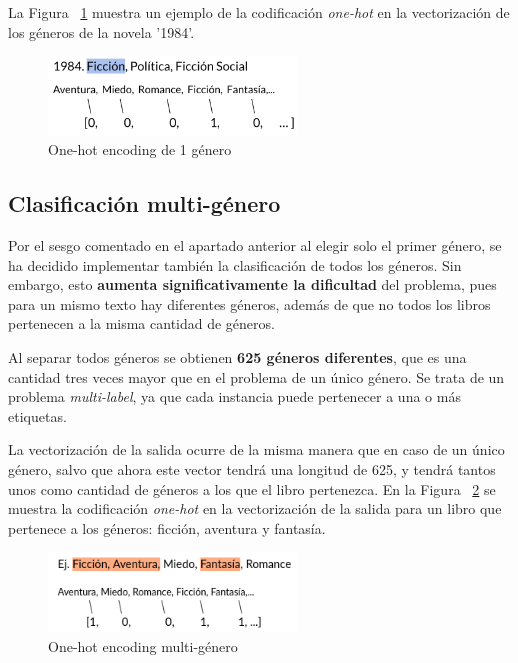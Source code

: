 \documentclass[12pt,a4paper, xcolor=table]{article}
\begin{document}
\vspace{3mm}

La Figura ~\ref{fig:unGenero} muestra un ejemplo de la codificación \textit{one-hot} en la vectorización de los géneros de la novela '1984'.

  \begin{figure}[!h]
    \centering
    \includegraphics[width=250px]{img/1984_Genres.png}
    \caption{One-hot encoding de 1 género}
    \label{fig:unGenero}
  \end{figure}

\newpage

\subsection{Clasificación multi-género}
Por el sesgo comentado en el apartado anterior al elegir solo el primer género, se ha decidido implementar también la clasificación de todos los géneros. Sin embargo, esto \textbf{aumenta significativamente la dificultad} del problema, pues para un mismo texto hay diferentes géneros, además de que no todos los libros pertenecen a la misma cantidad de géneros.

\vspace{3mm}

Al separar todos géneros se obtienen \textbf{625 géneros diferentes}, que es una cantidad tres veces mayor que en el problema de un único género. Se trata de un problema \textit{multi-label}, ya que cada instancia puede pertenecer a una o más etiquetas.

\vspace{3mm}

La vectorización de la salida ocurre de la misma manera que en caso de un único género, salvo que ahora este vector tendrá una longitud de 625, y tendrá tantos unos como cantidad de géneros a los que el libro pertenezca. En la Figura ~\ref{fig:variosGeneros} se muestra la codificación \textit{one-hot} en la vectorización de la salida para un libro que pertenece a los géneros: ficción, aventura y fantasía.

  \begin{figure}[!h]
    \centering
    \includegraphics[width=250px]{img/ej_one_hot_multi.png}
    \caption{One-hot encoding multi-género}
    \label{fig:variosGeneros}
  \end{figure}
\end{document}
